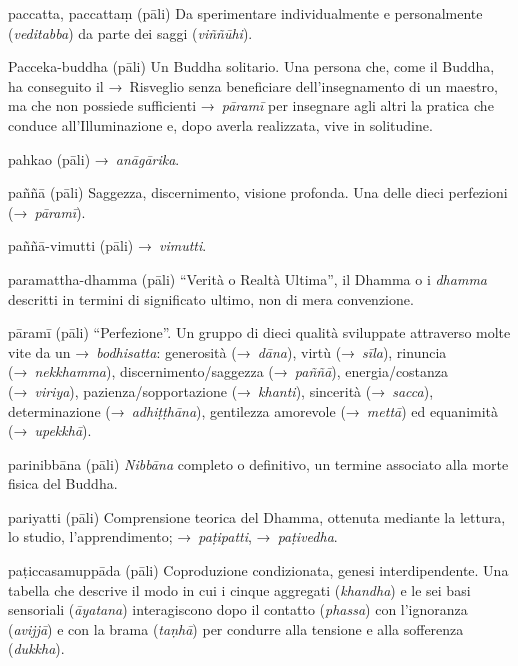 \begin{glossarydescription}
\item[paccatta, paccattaṃ] (pāli) Da sperimentare individualmente e
  personalmente (\emph{veditabba}) da parte dei saggi (\emph{viññūhi}).

\item[Pacceka-buddha] (pāli) Un Buddha solitario. Una persona che, come il
  Buddha, ha conseguito il →~Risveglio senza beneficiare dell'insegnamento di un
  maestro, ma che non possiede sufficienti →~\emph{pāramī} per insegnare agli
  altri la pratica che conduce all'Illuminazione e, dopo averla realizzata, vive
  in solitudine.

\item[pahkao] (pāli) →~\emph{anāgārika}.

\item[paññā] (pāli) Saggezza, discernimento, visione profonda. Una delle dieci
  perfezioni (→~\emph{pāramī}).

\item[paññā-vimutti] (pāli) →~\emph{vimutti}.

\item[paramattha-dhamma] (pāli) ``Verità o Realtà Ultima'', il Dhamma o i
  \emph{dhamma} descritti in termini di significato ultimo, non di mera
  convenzione.

\item[pāramī] (pāli)\label{glossary-parami} ``Perfezione''. Un gruppo di dieci qualità sviluppate
  attraverso molte vite da un →~\emph{bodhisatta}: generosità (→~\emph{dāna}),
  virtù (→~\emph{sīla}), rinuncia (→~\emph{nekkhamma}), discernimento/saggezza
  (→~\emph{paññā}), energia/costanza (→~\emph{viriya}), pazienza/sopportazione
  (→~\emph{khanti}), sincerità (→~\emph{sacca}), determinazione
  (→~\emph{adhiṭṭhāna}), gentilezza amorevole (→~\emph{mettā}) ed equanimità
  (→~\emph{upekkhā}).

\item[parinibbāna] (pāli) \emph{Nibbāna} completo o definitivo, un termine
  associato alla morte fisica del Buddha.

\item[pariyatti] (pāli) Comprensione teorica del Dhamma, ottenuta mediante la
  lettura, lo studio, l'apprendimento; →~\emph{paṭipatti}, →~\emph{paṭivedha}.

\item[paṭiccasamuppāda] (pāli) Coproduzione condizionata, genesi
  interdipendente. Una tabella che descrive il modo in cui i cinque aggregati
  (\emph{khandha}) e le sei basi sensoriali (\emph{āyatana}) interagiscono dopo
  il contatto (\emph{phassa}) con l'ignoranza (\emph{avijjā}) e con la brama
  (\emph{taṇhā}) per condurre alla tensione e alla sofferenza (\emph{dukkha}).


\end{glossarydescription}
